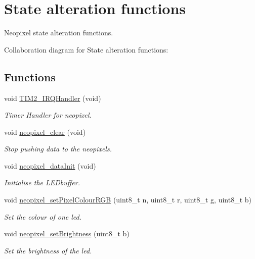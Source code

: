 \hypertarget{group___neo_pixel___state}{}\section{State alteration functions}
\label{group___neo_pixel___state}


Neopixel state alteration functions.  


Collaboration diagram for State alteration functions\+:
\subsection*{Functions}
\begin{DoxyCompactItemize}
\item 
void \hyperlink{group___neo_pixel___state_ga38ad4725462bdc5e86c4ead4f04b9fc2}{T\+I\+M2\+\_\+\+I\+R\+Q\+Handler} (void)
\begin{DoxyCompactList}\small\item\em Timer Handler for neopixel. \end{DoxyCompactList}\item 
void \hyperlink{group___neo_pixel___state_ga8e3cfef785ce221672f825f8785c25b8}{neopixel\+\_\+clear} (void)
\begin{DoxyCompactList}\small\item\em Stop pushing data to the neopixels. \end{DoxyCompactList}\item 
void \hyperlink{group___neo_pixel___state_ga79e34feddcfb2c45ae218166c84bdff4}{neopixel\+\_\+data\+Init} (void)
\begin{DoxyCompactList}\small\item\em Initialise the L\+E\+Dbuffer. \end{DoxyCompactList}\item 
void \hyperlink{group___neo_pixel___state_ga63c196a71ffb007411929e41ba5df41d}{neopixel\+\_\+set\+Pixel\+Colour\+R\+GB} (uint8\+\_\+t n, uint8\+\_\+t r, uint8\+\_\+t g, uint8\+\_\+t b)
\begin{DoxyCompactList}\small\item\em Set the colour of one led. \end{DoxyCompactList}\item 
void \hyperlink{group___neo_pixel___state_gae027558106eef5c81996294f4561fecb}{neopixel\+\_\+set\+Brightness} (uint8\+\_\+t b)
\begin{DoxyCompactList}\small\item\em Set the brightness of the led. \end{DoxyCompactList}\end{DoxyCompactItemize}



